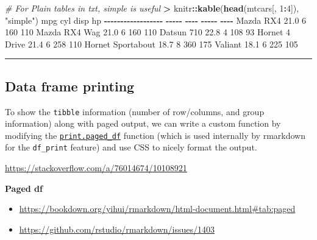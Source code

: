 \documentclass[
  a4paper,
  twoside,
  openright]{book}
\newenvironment{Shaded}{\begin{snugshade}}{\end{snugshade}}
\newcommand{\CommentTok}[1]{\textcolor[rgb]{0.56,0.35,0.01}{\textit{#1}}}
\newcommand{\DecValTok}[1]{\textcolor[rgb]{0.00,0.00,0.81}{#1}}
\newcommand{\ErrorTok}[1]{\textcolor[rgb]{0.64,0.00,0.00}{\textbf{#1}}}
\newcommand{\FloatTok}[1]{\textcolor[rgb]{0.00,0.00,0.81}{#1}}
\newcommand{\FunctionTok}[1]{\textcolor[rgb]{0.13,0.29,0.53}{\textbf{#1}}}
\newcommand{\NormalTok}[1]{#1}
\newcommand{\SpecialCharTok}[1]{\textcolor[rgb]{0.81,0.36,0.00}{\textbf{#1}}}
\newcommand{\StringTok}[1]{\textcolor[rgb]{0.31,0.60,0.02}{#1}}
\providecommand{\tightlist}{%
  \setlength{\itemsep}{0pt}\setlength{\parskip}{0pt}}
\theoremstyle{definition}
\theoremstyle{definition}
\theoremstyle{definition}
\theoremstyle{definition}
\theoremstyle{remark}
\begin{document}
\begin{Shaded}
\begin{Highlighting}[]
\CommentTok{\# For Plain tables in txt, \textasciigrave{}simple\textasciigrave{} is useful}
\ErrorTok{\textgreater{}}\NormalTok{ knitr}\SpecialCharTok{::}\FunctionTok{kable}\NormalTok{(}\FunctionTok{head}\NormalTok{(mtcars[, }\DecValTok{1}\SpecialCharTok{:}\DecValTok{4}\NormalTok{]), }\StringTok{"simple"}\NormalTok{) }
\NormalTok{                      mpg   cyl   disp    hp}
\SpecialCharTok{{-}{-}{-}{-}{-}{-}{-}{-}{-}{-}{-}{-}{-}{-}{-}{-}{-}{-}}  \SpecialCharTok{{-}{-}{-}{-}{-}}  \SpecialCharTok{{-}{-}{-}{-}}  \SpecialCharTok{{-}{-}{-}{-}{-}}  \SpecialCharTok{{-}{-}{-}{-}}
\NormalTok{Mazda RX4            }\FloatTok{21.0}     \DecValTok{6}    \DecValTok{160}   \DecValTok{110}
\NormalTok{Mazda RX4 Wag        }\FloatTok{21.0}     \DecValTok{6}    \DecValTok{160}   \DecValTok{110}
\NormalTok{Datsun }\DecValTok{710}           \FloatTok{22.8}     \DecValTok{4}    \DecValTok{108}    \DecValTok{93}
\NormalTok{Hornet }\DecValTok{4}\NormalTok{ Drive       }\FloatTok{21.4}     \DecValTok{6}    \DecValTok{258}   \DecValTok{110}
\NormalTok{Hornet Sportabout    }\FloatTok{18.7}     \DecValTok{8}    \DecValTok{360}   \DecValTok{175}
\NormalTok{Valiant              }\FloatTok{18.1}     \DecValTok{6}    \DecValTok{225}   \DecValTok{105}
\end{Highlighting}
\end{Shaded}

\begin{center}\rule{0.5\linewidth}{0.5pt}\end{center}

\subsection{Data frame printing}\label{data-frame-printing}

To show the \texttt{tibble} information (number of row/columns, and group information) along with paged output, we can write a custom function by modifying the \href{https://github.com/rstudio/rmarkdown/blob/main/R/html_paged.R\#L241-L248}{\texttt{print.paged\_df}} function (which is used internally by rmarkdown for the \texttt{df\_print} feature) and use CSS to nicely format the output.

\url{https://stackoverflow.com/a/76014674/10108921}

{\textbf{Paged df}}

\begin{itemize}
\tightlist
\item
  \url{https://bookdown.org/yihui/rmarkdown/html-document.html\#tab:paged}
\item
  \url{https://github.com/rstudio/rmarkdown/issues/1403}
\end{itemize}
\end{document}
